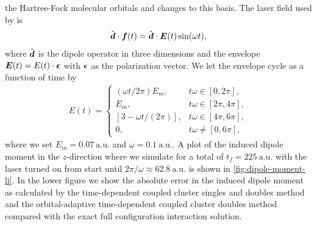             the Hartree-Fock molecular orbitals and changes to this basis.
            The laser field used by \citeauthor{li_2005} is
            \begin{align}
                \hat{\boldsymbol{d}} \cdot \boldsymbol{f}(t)
                = \hat{\boldsymbol{d}} \cdot \boldsymbol{E}(t)\sin(\omega t),
            \end{align}
            where $\hat{\boldsymbol{d}}$ is the dipole operator in three dimensions and
            the envelope $\boldsymbol{E}(t) = E(t) \cdot \boldsymbol{\epsilon}$ with
            $\boldsymbol{\epsilon}$ as the polarization vector.
            We let the envelope cycle as a function of time by
            \begin{align}
                E(t) = \begin{cases}
                    (\omega t / 2\pi) E_m, & t\omega \in [0, 2\pi], \\
                    E_m, & t\omega \in [2\pi, 4\pi], \\
                    [3 - \omega t / (2\pi)], & t\omega \in [4\pi, 6\pi], \\
                    0, & t\omega \neq [0, 6\pi],
                \end{cases}
            \end{align}
            where we set $E_m = \SI{0.07}{\text{a.u.}}$ and $\omega =
            \SI{0.1}{\text{a.u.}}$.
            A plot of the induced dipole moment in the $z$-direction where we
            simulate for a total of $t_f = \SI{225}{\text{a.u.}}$ with the laser
            turned on from start until $2\pi/\omega \approx
            \SI{62.8}{\text{a.u.}}$ is shown in \autoref{fig:dipole-moment-li}.
            In the lower figure we show the absolute error in the induced dipole
            moment as calculated by the time-dependent coupled cluster singles
            and doubles method and the orbital-adaptive time-dependent coupled
            cluster doubles method compared with the exact full configuration
            interaction solution.

